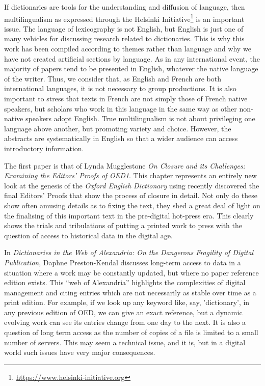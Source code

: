 \documentclass[output=paper]{langscibook}
\begin{document}
If dictionaries are tools for the understanding and diffusion of language, then multilingualism as expressed through the Helsinki Initiative\footnote{\url{https://www.helsinki-initiative.org}} is an important issue. The language of lexicography is not English, but English is just one of many vehicles for discussing research related to dictionaries. This is why this work has been compiled according to themes rather than language and why we have not created artificial sections by language. As in any international event, the majority of papers tend to be presented in English, whatever the native language of the writer. Thus, we consider that, as English and French are both international languages, it is not necessary to group productions. It is also important to stress that texts in French are not simply those of French native speakers, but scholars who work in this language in the same way as other non-native speakers adopt English. True multilingualism is not about privileging one language above another, but promoting variety and choice. However, the abstracts are systematically in English so that a wider audience can access introductory information.

The first paper is that of Lynda Mugglestone \textit{On Closure and its Challenges: Examining the Editors’ Proofs of OED1}. This chapter represents an entirely new look at the genesis of the \textit{Oxford English Dictionary} using recently discovered the final Editors' Proofs that show the process of closure in detail. Not only do these show often amusing details as to fixing the text, they shed a great deal of light on the finalising of this important text in the pre-digital hot-press era. This clearly shows the trials and tribulations of putting a printed work to press with the question of access to historical data in the digital age. 

In \textit{Dictionaries in the Web of Alexandria: On the Dangerous Fragility of Digital Publication}, Daphne Preston-Kendal discusses long-term access to data in a situation where a work may be constantly updated, but where no paper reference edition exists. This “web of Alexandria” highlights the complexities of digital management and citing entries which are not necessarily as stable over time as a print edition. For example, if we look up any keyword like, say, 'dictionary', in any previous edition of OED, we can give an exact reference, but a dynamic evolving work can see its entries change from one day to the next. It is also a question of long term access as the number of copies of a file is limited to a small number of servers. This may seem a technical issue, and it is, but in a digital world such issues have very major consequences.
\end{document}
